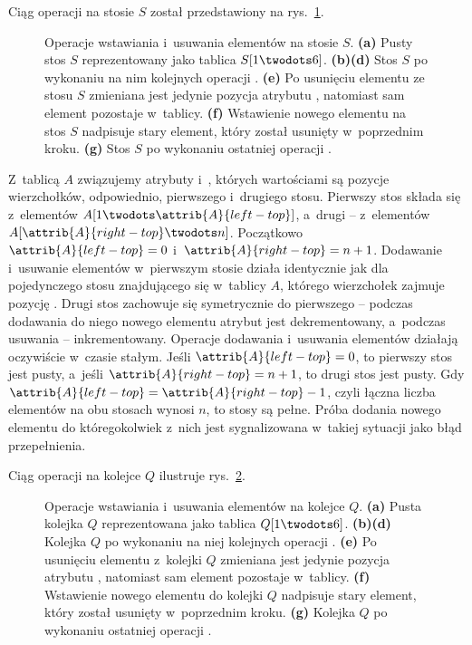 
\exercise %
Ciąg operacji na stosie $S$ został przedstawiony na rys.\ \ref{fig:10.1-1}.
\begin{figure}[!ht]
	\centering 
	\caption{Operacje wstawiania i~usuwania elementów na stosie $S$.
{\sffamily\bfseries(a)} Pusty stos $S$ reprezentowany jako tablica $S[1\twodots6]$.
{\sffamily\bfseries(b)\nbendash(d)} Stos $S$ po wykonaniu na nim kolejnych operacji .
{\sffamily\bfseries(e)} Po usunięciu elementu ze stosu $S$ zmieniana jest jedynie pozycja atrybutu , natomiast sam element pozostaje w~tablicy.
{\sffamily\bfseries(f)} Wstawienie nowego elementu na stos $S$ nadpisuje stary element, który został usunięty w~poprzednim kroku.
{\sffamily\bfseries(g)} Stos $S$ po wykonaniu ostatniej operacji .} \label{fig:10.1-1}
\end{figure}

\exercise %
Z~tablicą $A$ związujemy atrybuty  i~, których wartościami są pozycje wierzchołków, odpowiednio, pierwszego i~drugiego stosu.
Pierwszy stos składa się z~elementów $A[1\twodots\attrib{A}{left-top}]$, a~drugi -- z~elementów $A[\attrib{A}{right-top}\twodots n]$.
Początkowo $\attrib{A}{left-top}=0$ i~$\attrib{A}{right-top}=n+1$.
Dodawanie i~usuwanie elementów w~pierwszym stosie działa identycznie jak dla pojedynczego stosu znajdującego się w~tablicy $A$, którego wierzchołek zajmuje pozycję .
Drugi stos zachowuje się symetrycznie do pierwszego -- podczas dodawania do niego nowego elementu atrybut  jest dekrementowany, a~podczas usuwania -- inkrementowany.
Operacje dodawania i~usuwania elementów działają oczywiście w~czasie stałym.
Jeśli $\attrib{A}{left-top}=0$, to pierwszy stos jest pusty, a~jeśli $\attrib{A}{right-top}=n+1$, to drugi stos jest pusty.
Gdy $\attrib{A}{left-top}=\attrib{A}{right-top}-1$, czyli łączna liczba elementów na obu stosach wynosi $n$, to stosy są pełne.
Próba dodania nowego elementu do któregokolwiek z~nich jest sygnalizowana w~takiej sytuacji jako błąd przepełnienia.

\exercise %
Ciąg operacji na kolejce $Q$ ilustruje rys.\ \ref{fig:10.1-3}.

\begin{figure}[!ht]
	\centering 
	\caption{Operacje wstawiania i~usuwania elementów na kolejce $Q$.
{\sffamily\bfseries(a)} Pusta kolejka $Q$ reprezentowana jako tablica $Q[1\twodots6]$.
{\sffamily\bfseries(b)\nbendash(d)} Kolejka $Q$ po wykonaniu na niej kolejnych operacji .
{\sffamily\bfseries(e)} Po usunięciu elementu z~kolejki $Q$ zmieniana jest jedynie pozycja atrybutu , natomiast sam element pozostaje w~tablicy.
{\sffamily\bfseries(f)} Wstawienie nowego elementu do kolejki $Q$ nadpisuje stary element, który został usunięty w~poprzednim kroku.
{\sffamily\bfseries(g)} Kolejka $Q$ po wykonaniu ostatniej operacji .} \label{fig:10.1-3}
\end{figure}


